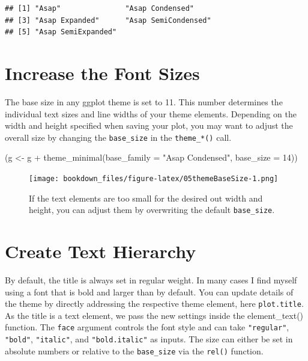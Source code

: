 \documentclass[
]{krantz}
\makeatletter
\newenvironment{Shaded}{\begin{snugshade}}{\end{snugshade}}
\newcommand{\AttributeTok}[1]{\textcolor[rgb]{0.61,0.61,0.61}{#1}}
\newcommand{\DecValTok}[1]{\textcolor[rgb]{0.06,0.06,0.06}{#1}}
\newcommand{\FunctionTok}[1]{\textcolor[rgb]{0,0,0}{#1}}
\newcommand{\NormalTok}[1]{#1}
\newcommand{\OtherTok}[1]{\textcolor[rgb]{0.37,0.37,0.37}{#1}}
\newcommand{\SpecialCharTok}[1]{\textcolor[rgb]{0,0,0}{#1}}
\newcommand{\StringTok}[1]{\textcolor[rgb]{0.5,0.5,0.5}{#1}}
\newenvironment{kframe}{%
\medskip{}
\setlength{\fboxsep}{.8em}
 \def\at@end@of@kframe{}%
 \ifinner\ifhmode%
  \def\at@end@of@kframe{\end{minipage}}%
  \begin{minipage}{\columnwidth}%
 \fi\fi%
 \def\FrameCommand##1{\hskip\@totalleftmargin \hskip-\fboxsep
 \colorbox{shadecolor}{##1}\hskip-\fboxsep
     \hskip-\linewidth \hskip-\@totalleftmargin \hskip\columnwidth}%
 \MakeFramed {\advance\hsize-\width
   \@totalleftmargin\z@ \linewidth\hsize
   \@setminipage}}%
 {\par\unskip\endMakeFramed%
 \at@end@of@kframe}
\renewenvironment{Shaded}{\begin{kframe}}{\end{kframe}}
\makeatother
\begin{document}
\begin{verbatim}
## [1] "Asap"               "Asap Condensed"    
## [3] "Asap Expanded"      "Asap SemiCondensed"
## [5] "Asap SemiExpanded"
\end{verbatim}

\hypertarget{increase-the-font-sizes}{%
\section{Increase the Font Sizes}\label{increase-the-font-sizes}}

The base size in any ggplot theme is set to 11. This number determines the individual text sizes and line widths of your theme elements. Depending on the width and height specified when saving your plot, you may want to adjust the overall size by changing the \texttt{base\_size} in the \texttt{theme\_*()} call.

\begin{Shaded}
\begin{Highlighting}[]
\NormalTok{(g }\OtherTok{\textless{}{-}}\NormalTok{ g }\SpecialCharTok{+} \FunctionTok{theme\_minimal}\NormalTok{(}\AttributeTok{base\_family =} \StringTok{"Asap Condensed"}\NormalTok{, }\AttributeTok{base\_size =} \DecValTok{14}\NormalTok{))}
\end{Highlighting}
\end{Shaded}

\begin{figure}
\centering
\texttt{[image: bookdown\_files/figure-latex/05themeBaseSize-1.png]}
\caption{\label{fig:05themeBaseSize}If the text elements are too small for the desired out width and height, you can adjust them by overwriting the default \texttt{base\_size}.}
\end{figure}

\hypertarget{create-text-hierarchy}{%
\section{Create Text Hierarchy}\label{create-text-hierarchy}}

By default, the title is always set in regular weight. In many cases I find myself using a font that is bold and larger than by default. You can update details of the theme by directly addressing the respective theme element, here \texttt{plot.title}. As the title is a text element, we pass the new settings inside the element\_text() function. The \texttt{face} argument controls the font style and can take \texttt{"regular"}, \texttt{"bold"}, \texttt{"italic"}, and \texttt{"bold.italic"} as inputs. The size can either be set in absolute numbers or relative to the \texttt{base\_size} via the \texttt{rel()} function.
\end{document}
